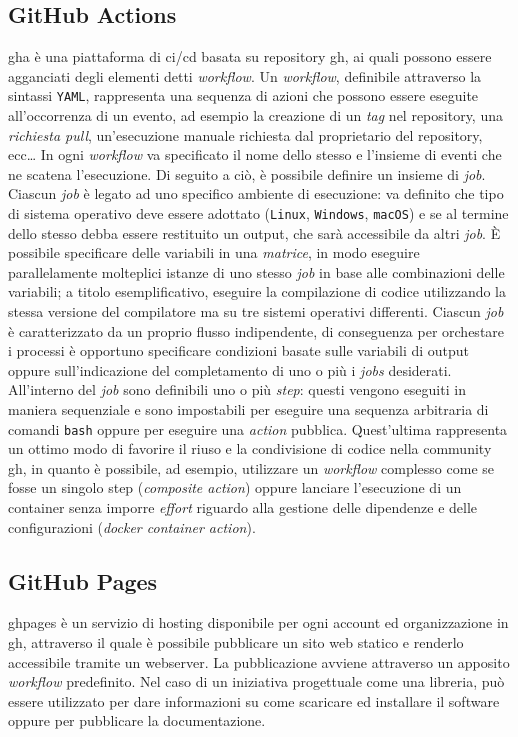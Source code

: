 \documentclass[12pt,a4paper,openright,twoside]{book}
\begin{document}
\subsection{GitHub Actions}
\ac{gha} è una piattaforma di \ac{ci}/\ac{cd} basata su repository \ac{gh},
ai quali possono essere agganciati degli elementi detti \textit{workflow}.
Un \textit{workflow}, definibile attraverso la sintassi \texttt{YAML}, rappresenta una sequenza di azioni che possono essere eseguite
all'occorrenza di un evento, ad esempio la creazione di un \textit{tag} nel repository,
una \textit{richiesta pull}, un'esecuzione manuale richiesta dal proprietario del repository, ecc\dots
In ogni \textit{workflow} va specificato il nome dello stesso e l'insieme di eventi che ne scatena 
l'esecuzione. 
Di seguito a ciò, è possibile definire un insieme di \textit{job}.
Ciascun \textit{job} è legato ad uno specifico ambiente di esecuzione: va definito che tipo di
sistema operativo deve essere adottato (\texttt{Linux}, \texttt{Windows}, \texttt{macOS})
e se al termine dello stesso debba essere restituito un output, che sarà accessibile da altri \textit{job}.
È possibile specificare delle variabili in una \textit{matrice}, in modo eseguire parallelamente molteplici istanze di uno stesso \textit{job} 
in base alle combinazioni delle variabili; a titolo esemplificativo, eseguire la compilazione di codice utilizzando
la stessa versione del compilatore ma su tre sistemi operativi differenti.  
Ciascun \textit{job} è caratterizzato da un proprio flusso indipendente, di conseguenza
per orchestare i processi è opportuno specificare condizioni basate sulle variabili di output 
oppure sull'indicazione del completamento di uno o più i \textit{jobs} desiderati.
All'interno del \textit{job} sono definibili uno o più \textit{step}: questi vengono eseguiti in maniera sequenziale
e sono impostabili per eseguire una sequenza arbitraria di comandi \texttt{bash} oppure
per eseguire una \textit{action} pubblica.
Quest'ultima rappresenta un ottimo modo di favorire il riuso
e la condivisione di codice nella community \ac{gh}, in quanto è possibile, ad esempio, utilizzare un \textit{workflow} complesso
come se fosse un singolo step (\textit{composite action}) oppure lanciare l'esecuzione di un container senza
imporre \textit{effort} riguardo alla gestione delle dipendenze e delle configurazioni (\textit{docker container action}).
\subsection{GitHub Pages}
\ac{ghpages} è un servizio di hosting disponibile per ogni account ed organizzazione in \ac{gh},
attraverso il quale è possibile pubblicare un sito web statico e renderlo accessibile tramite un webserver.
La pubblicazione avviene attraverso un apposito \textit{workflow} predefinito.
Nel caso di un iniziativa progettuale come una libreria, può essere utilizzato per dare informazioni 
su come scaricare ed installare il software oppure per pubblicare la documentazione.
\end{document}

